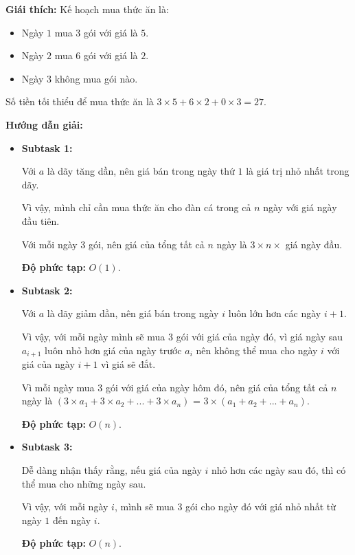 \documentclass[12pt]{scrartcl}  %
\begin{document}
\textbf{Giái thích:}
Kế hoạch mua thức ăn là:
\begin{itemize}
    \item Ngày $1$ mua $3$ gói với giá là $5$.
    \item Ngày $2$ mua $6$ gói với giá là $2$.
    \item Ngày $3$ không mua gói nào.
\end{itemize}
Số tiền tối thiểu để mua thức ăn là $3 \times 5 + 6 \times 2 + 0 \times 3 = 27$.

\textbf{Hướng dẫn giải:}

\begin{itemize}
    \item \textbf{Subtask 1:}
    
    Với $a$ là dãy tăng dần, nên giá bán trong ngày thứ $1$ là giá trị nhỏ nhất
    trong dãy.
    
    Vì vậy, mình chỉ cần mua thức ăn cho đàn cá trong cả $n$ ngày với giá ngày đầu tiên.

    Với mỗi ngày $3$ gói, nên giá của tổng tất cả $n$ ngày là $3 \times n \times $ giá ngày đầu.

    \textbf{Độ phức tạp:} $O(1)$.

    \item \textbf{Subtask 2:}
    
    Với $a$ là dãy giảm dần, nên giá bán trong ngày $i$ luôn lớn hơn các ngày $i + 1$.

    Vì vậy, với mỗi ngày mình sẽ mua $3$ gói với giá của ngày đó, vì giá ngày sau $a_{i + 1}$ luôn nhỏ hơn
    giá của ngày trước $a_i$ nên không thể mua cho ngày $i$ với giá của ngày $i + 1$ vì giá sẽ đắt.

    Vì mỗi ngày mua $3$ gói với giá của ngày hôm đó, nên giá của tổng tất cả $n$ ngày
    là $(3 \times a_1 + 3 \times a_2 + ... + 3 \times a_n)$ = $3 \times (a_1 + a_2 + ... + a_n)$.

    \textbf{Độ phức tạp:} $O(n)$.

    \item \textbf{Subtask 3:}
    
    Dễ dàng nhận thấy rằng, nếu giá của ngày $i$ nhỏ hơn các ngày sau đó, thì có thể mua cho những
    ngày sau.

    Vì vậy, với mỗi ngày $i$, mình sẽ mua $3$ gói cho ngày đó với giá nhỏ nhất từ ngày $1$ đến ngày $i$.

    \textbf{Độ phức tạp:} $O(n)$.

\end{itemize}
\end{document}
